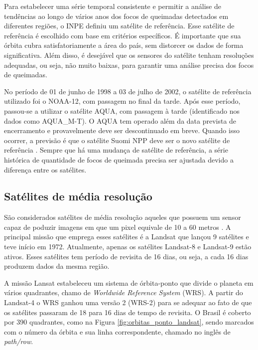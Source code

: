 \documentclass[cic,tc]{iiufrgs}
\begin{document}
Para estabelecer uma série temporal consistente e permitir a análise de tendências ao longo de vários anos dos focos de queimadas detectados em diferentes regiões, o INPE definiu um satélite de referência. Esse satélite de referência é escolhido com base em critérios específicos. É importante que sua órbita cubra satisfatoriamente a área do país, sem distorcer os dados de forma significativa. Além disso, é desejável que os sensores do satélite tenham resoluções adequadas, ou seja, não muito baixas, para garantir uma análise precisa dos focos de queimadas. \citep{PerguntasFrequentesINPE}

No período de 01 de junho de 1998 a 03 de julho de 2002, o satélite de referência utilizado foi o NOAA-12, com passagem no final da tarde. Após esse período, passou-se a utilizar o satélite AQUA, com passagem à tarde (identificado nos dados como AQUA\_M-T). O AQUA tem operado além da data prevista de encerramento e provavelmente deve ser descontinuado em breve. Quando isso ocorrer, a previsão é que o satélite Suomi NPP deve ser o novo satélite de referência \citep{PerguntasFrequentesINPE}. Sempre que há uma mudança de satélite de referência, a série histórica de quantidade de focos de queimada precisa ser ajustada devido a diferença entre os satélites.

\subsection*{Satélites de média resolução}

São considerados satélites de média resolução aqueles que possuem um sensor capaz de poduzir imagens em que um pixel equivale de 10 a 60 metros \citep{EmbrapaSatelites}. A principal missão que emprega esses satélites é a Landsat que lançou 9 satélites e teve início em 1972. Atualmente, apenas os satélites Landsat-8 e Landsat-9 estão ativos. Esses satélites tem período de revisita de 16 dias, ou seja, a cada 16 dias produzem dados da mesma região. 

A missão Lansat estabeleceu um sistema de órbita-ponto que divide o planeta em vários quadrantes, chamo de \textit{Worldwide Reference System} (WRS). A partir do Landsat-4 o WRS ganhou uma versão 2 (WRS-2) para se adequar ao fato de que os satélites passaram de 18 para 16 dias de tempo de revisita. O Brasil é coberto por 390 quadrantes, como na Figura \ref{fig:orbitas_ponto_landsat}, sendo marcados com o número da órbita e sua linha correspondente, chamado no inglês de \textit{path/row}.
\end{document}
